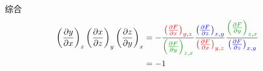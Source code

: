 综合
\begin{equation}
    \begin{aligned}
        \left( \frac{\partial y}{\partial x} \right) _z\left( \frac{\partial x}{\partial z} \right) _y\left( \frac{\partial z}{\partial y} \right) _x&=-\frac{{\color[RGB]{240, 0, 0} \left( \frac{\partial F}{\partial x} \right) _{y,z}}}{{\color[RGB]{0, 160, 0} \left( \frac{\partial F}{\partial y} \right) _{z,x}}}\frac{{\color[RGB]{0, 0, 240} \left( \frac{\partial F}{\partial z} \right) _{x,y}}}{{\color[RGB]{240, 0, 0} \left( \frac{\partial F}{\partial x} \right) _{y,z}}}\frac{{\color[RGB]{0, 160, 0} \left( \frac{\partial F}{\partial y} \right) _{z,x}}}{{\color[RGB]{0, 0, 240} \left( \frac{\partial F}{\partial z} \right) _{x,y}}}
\\
&=-1
    \end{aligned}
\end{equation}



